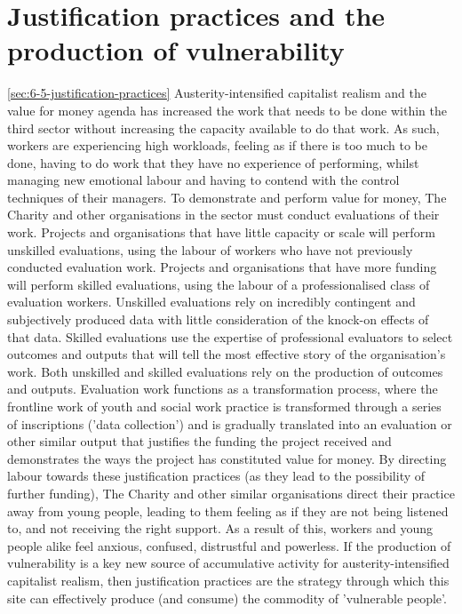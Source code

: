 \section{Justification practices and the production of vulnerability}
\ref{sec:6-5-justification-practices}
Austerity-intensified capitalist realism and the value for money agenda has increased the work that needs to be done within the third sector without increasing the capacity available to do that work. As such, workers are experiencing high workloads, feeling as if there is too much to be done, having to do work that they have no experience of performing, whilst managing new emotional labour and having to contend with the control techniques of their managers. To demonstrate and perform value for money, The Charity and other organisations in the sector must conduct evaluations of their work. Projects and organisations that have little capacity or scale will perform unskilled evaluations, using the labour of workers who have not previously conducted evaluation work. Projects and organisations that have more funding will perform skilled evaluations, using the labour of a professionalised class of evaluation workers. Unskilled evaluations rely on incredibly contingent and subjectively produced data with little consideration of the knock-on effects of that data. Skilled evaluations use the expertise of professional evaluators to select outcomes and outputs that will tell the most effective story of the organisation's work. Both unskilled and skilled evaluations rely on the production of outcomes and outputs. Evaluation work functions as a transformation process, where the frontline work of youth and social work practice is transformed through a series of inscriptions ('data collection') and is gradually translated into an evaluation or other similar output that justifies the funding the project received and demonstrates the ways the project has constituted value for money. By directing labour towards these justification practices (as they lead to the possibility of further funding), The Charity and other similar organisations direct their practice away from young people, leading to them feeling as if they are not being listened to, and not receiving the right support. As a result of this, workers and young people alike feel anxious, confused, distrustful and powerless. If the production of vulnerability is a key new source of accumulative activity for austerity-intensified capitalist realism, then justification practices are the strategy through which this site can effectively produce (and consume) the commodity of 'vulnerable people'. 

